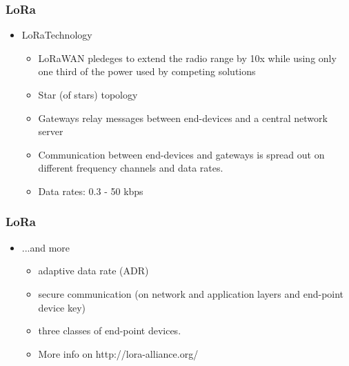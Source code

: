 \begin{frame}[fragile]
  \frametitle{LoRa\texttrademark}
  \begin{itemize}
    \item LoRa\texttrademark Technology
    \begin{itemize}
      \item LoRaWAN pledeges to extend the radio range by 10x while using only one third of the power used by competing solutions 
      \item Star (of stars) topology
      \item Gateways relay messages between end-devices and a central network server
      \item Communication between end-devices and gateways is spread out on different frequency channels and data rates.
      \item Data rates: 0.3 - 50 kbps
    \end{itemize}
  \end{itemize}
\end{frame}

\begin{frame}[fragile]
  \frametitle{LoRa\texttrademark}
  \begin{itemize}
    \item ...and more
    \begin{itemize}
      \item adaptive data rate (ADR)
      \item secure communication (on network and application layers and end-point device key)
      \item three classes of end-point devices.
      \item More info on http://lora-alliance.org/
    \end{itemize}
  \end{itemize}
\end{frame}

